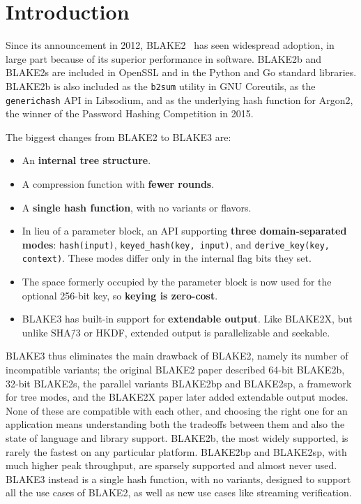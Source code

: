 \documentclass[12pt,notitlepage,a4paper]{article}
\begin{document}
\newpage

\section{Introduction}\label{sec:intro}

Since its announcement in 2012, BLAKE2~\cite{DBLP:conf/acns/AumassonNWW13} has 
seen widespread adoption, in large
part because of its superior performance in software. 
BLAKE2b and BLAKE2s are included in OpenSSL and in the Python and Go
standard libraries. 
BLAKE2b is also included as the \texttt{b2sum} utility in GNU Coreutils,
as the \texttt{generichash} API in Libsodium, and as the underlying hash function for
Argon2, the winner of the Password Hashing Competition in 2015.

The biggest changes from BLAKE2 to BLAKE3 are:

\begin{itemize}
    \item An \textbf{internal tree structure}.
    \item A compression function with \textbf{fewer rounds}.
    \item A \textbf{single hash function}, with no variants or flavors.
    \item In lieu of a parameter block, an API supporting \textbf{three
        domain-separated modes}: \texttt{hash(input)},
        \texttt{keyed\_hash(key, input)}, and \texttt{derive\_key(key,
        context)}. These modes differ only in the internal flag bits they set.
    \item The space formerly occupied by the parameter block is now used for
        the optional 256-bit key, so \textbf{keying is zero-cost}.
    \item BLAKE3 has built-in support for \textbf{extendable output}. Like
        BLAKE2X, but unlike SHA\=/3 or HKDF, extended output is parallelizable
        and seekable.
\end{itemize}

BLAKE3 thus eliminates the main drawback of BLAKE2, namely its number of
incompatible variants;
the original BLAKE2 paper described 64-bit BLAKE2b, 32-bit BLAKE2s, the parallel
variants BLAKE2bp and BLAKE2sp, a framework for tree modes, and the
BLAKE2X paper later added extendable output modes. 
None of these are compatible with each other, and choosing the right one
for an application means understanding both the tradeoffs between them
and also the state of language and library support.  
BLAKE2b, the most widely supported, is rarely the fastest on any
particular platform.
BLAKE2bp and BLAKE2sp, with much higher peak throughput, are sparsely
supported and almost never used.
BLAKE3 instead is a single hash function, with no variants, designed to
support all the use cases of BLAKE2, as well as new use cases like
streaming verification. 
\end{document}
